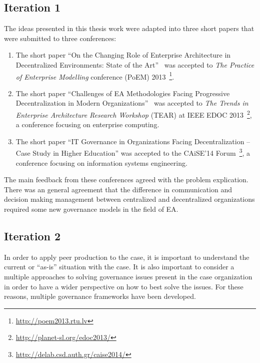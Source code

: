 \subsection{Iteration 1}

The ideas presented in this thesis work were adapted into three short papers that were submitted to three conferences: 
\begin{enumerate}
\item The short paper ``On the Changing Role of Enterprise Architecture in Decentralized Environments: State of the Art''~\cite{speckert2013} was accepted to \textit{The Practice of Enterprise Modelling} conference (PoEM) 2013~\footnote{\url{http://poem2013.rtu.lv}}.
\item The short paper ``Challenges of EA Methodologies Facing Progressive Decentralization in Modern Organizations''~\cite{rychkova2013} was accepted to \textit{The Trends in Enterprise Architecture Research Workshop} (TEAR) at IEEE EDOC 2013~\footnote{\url{http://planet-sl.org/edoc2013/}}, a conference focusing on enterprise computing.
\item The short paper ``IT Governance in Organizations Facing Decentralization – Case Study in Higher Education'' was accepted to the CAiSE'14 Forum~\footnote{\url{http://delab.csd.auth.gr/caise2014/}}, a conference focusing on information systems engineering.
\end{enumerate}

The main feedback from these conferences agreed with the problem explication. There was an general agreement that the difference in communication and decision making management between centralized and decentralized organizations required some new governance models in the field of EA. 

\subsection{Iteration 2}

In order to apply peer production to the case, it is important to understand the current or ``as-is'' situation with the case. It is also important to consider a multiple approaches to solving governance issues present in the case organization in order to have a wider perspective on how to best solve the issues.  For these reasons, multiple governance frameworks have been developed.

